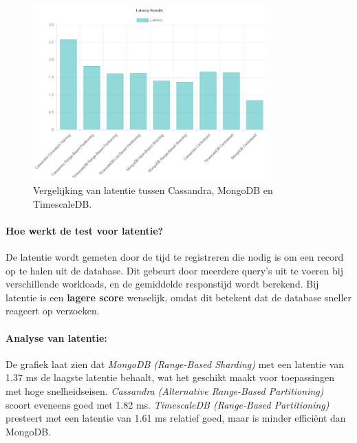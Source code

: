 \begin{figure}[H]
	\centering
	\includegraphics[width=0.8\textwidth]{Latency.png}
	\caption{Vergelijking van latentie tussen Cassandra, MongoDB en TimescaleDB.}
	\label{fig:latency-comparison}
\end{figure}

\paragraph{Hoe werkt de test voor latentie?} 
De latentie wordt gemeten door de tijd te registreren die nodig is om een record op te halen uit de database. Dit gebeurt door meerdere query's uit te voeren bij verschillende workloads, en de gemiddelde responstijd wordt berekend. Bij latentie is een \textbf{lagere score} wenselijk, omdat dit betekent dat de database sneller reageert op verzoeken.

\paragraph{Analyse van latentie:}
De grafiek laat zien dat \textit{MongoDB (Range-Based Sharding)} met een latentie van 1.37 ms de laagste latentie behaalt, wat het geschikt maakt voor toepassingen met hoge snelheidseisen. \textit{Cassandra (Alternative Range-Based Partitioning)} scoort eveneens goed met 1.82 ms. \textit{TimescaleDB (Range-Based Partitioning)} presteert met een latentie van 1.61 ms relatief goed, maar is minder efficiënt dan MongoDB.

